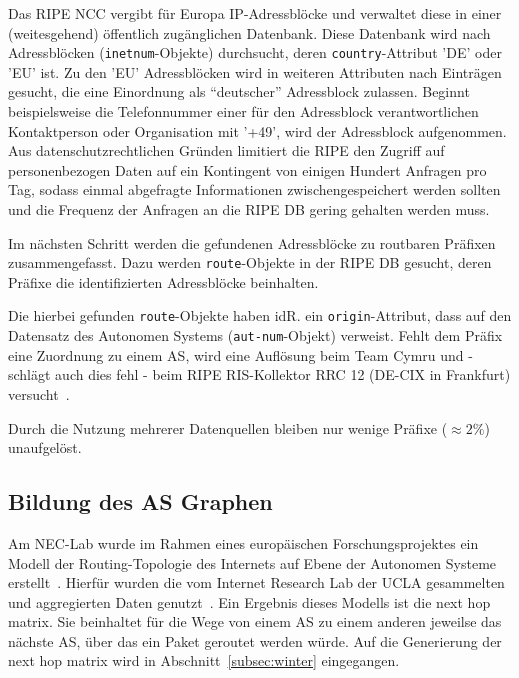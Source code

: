 Das RIPE NCC vergibt für Europa IP-Adressblöcke und verwaltet diese in einer (weitesgehend) öffentlich zugänglichen Datenbank.
Diese Datenbank wird nach Adressblöcken (\texttt{inetnum}-Objekte) durchsucht, deren \texttt{country}-Attribut 'DE' oder 'EU' ist.
Zu den 'EU' Adressblöcken wird in weiteren Attributen nach Einträgen gesucht, die eine Einordnung als "`deutscher"' Adressblock zulassen.
Beginnt beispielsweise die Telefonnummer einer für den Adressblock verantwortlichen Kontaktperson oder Organisation mit '+49', wird der Adressblock aufgenommen.
Aus datenschutzrechtlichen Gründen limitiert die RIPE den Zugriff auf personenbezogen Daten auf ein Kontingent von einigen Hundert Anfragen pro Tag, sodass einmal abgefragte Informationen zwischengespeichert werden sollten und die Frequenz der Anfragen an die RIPE DB gering gehalten werden muss.

Im nächsten Schritt werden die gefundenen Adressblöcke zu routbaren Präfixen zusammengefasst.
Dazu werden \texttt{route}-Objekte in der RIPE DB gesucht, deren Präfixe die identifizierten Adressblöcke beinhalten.


Die hierbei gefunden \texttt{route}-Objekte haben idR. ein \texttt{origin}-Attribut, dass auf den Datensatz des Autonomen Systems (\texttt{aut-num}-Objekt) verweist.
Fehlt dem Präfix eine Zuordnung zu einem AS, wird eine Auflösung beim Team Cymru und - schlägt auch dies fehl - beim RIPE RIS-Kollektor RRC 12 (DE-CIX in Frankfurt) versucht~\cite{RIPE:RIS, Cymru}.

Durch die Nutzung mehrerer Datenquellen bleiben nur wenige Präfixe ($\approx 2\%$) unaufgelöst.


\subsection{Bildung des AS Graphen}\label{atlas:graph}

Am NEC-Lab wurde im Rahmen eines europäischen Forschungsprojektes ein Modell der Routing-Topologie des Internets auf Ebene der Autonomen Systeme erstellt~\cite{conf/pads/Winter09}.
Hierfür wurden die vom Internet Research Lab der UCLA gesammelten und aggregierten Daten genutzt~\cite{IRLtopology}.
Ein Ergebnis dieses Modells ist die next hop matrix.
Sie beinhaltet für die Wege von einem AS zu einem anderen jeweilse das nächste AS, über das ein Paket geroutet werden würde.
Auf die Generierung der next hop matrix wird in Abschnitt~\ref{subsec:winter} eingegangen.

